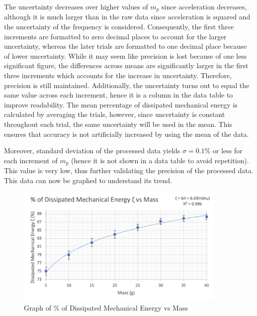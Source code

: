 \documentclass[11pt]{article}
\begin{document}
The uncertainty decreases over higher values of $m_p$ since acceleration decreases, although it is much larger than in the raw data since acceleration is squared and the uncertainty of the frequency is considered. Consequently, the first three increments are formatted to zero decimal places to account for the larger uncertainty, whereas the later trials are formatted to one decimal place because of lower uncertainty. While it may seem like precision is lost because of one less significant figure, the differences across means are significantly larger in the first three increments which accounts for the increase in uncertainty. Therefore, precision is still maintained. Additionally, the uncertainty turns out to equal the same value across each increment, hence it is a column in the data table to improve readability. The mean percentage of dissipated mechanical energy is calculated by averaging the trials, however, since uncertainty is constant throughout each trial, the same uncertainty will be used in the mean. This ensures that accuracy is not artificially increased by using the mean of the data. 

\newpage
Moreover, standard deviation of the processed data yields $\sigma =0.1\%$ or less for each increment of $m_p$ (hence it is not shown in a data table to avoid repetition). This value is very low, thus further validating the precision of the processed data. This data can now be graphed to understand its trend. 


\begin{figure}[h]
    \centering
    \includegraphics[width=0.9\textwidth]{img/graph1.png}
    \vspace{-20pt}
    \caption{Graph of \% of Dissipated Mechanical Energy vs Mass}
    \label{fig:6}
\end{figure}
\end{document}
